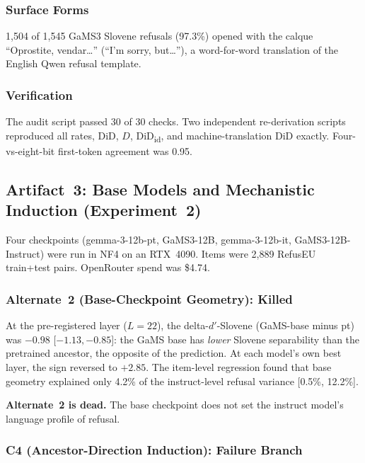 \documentclass[11pt,letterpaper]{article}
\begin{document}
\subsubsection{Surface Forms}

1,504 of 1,545 GaMS3 Slovene refusals (97.3\%) opened with the calque ``Oprostite, vendar\ldots'' (``I'm sorry, but\ldots''), a word-for-word translation of the English Qwen refusal template.

\subsubsection{Verification}

The audit script passed 30 of 30 checks. Two independent re-derivation scripts reproduced all rates, DiD, $D$, DiD\textsubscript{id}, and machine-translation DiD exactly. Four-vs-eight-bit first-token agreement was 0.95.


\subsection{Artifact~3: Base Models and Mechanistic Induction (Experiment~2)}
\label{gen_art_experiment_2}

Four checkpoints (gemma-3-12b-pt, GaMS3-12B, gemma-3-12b-it, GaMS3-12B-Instruct) were run in NF4 on an RTX~4090. Items were 2,889 RefusEU train+test pairs. OpenRouter spend was \$4.74.

\subsubsection{Alternate~2 (Base-Checkpoint Geometry): Killed}

At the pre-registered layer ($L = 22$), the delta-$d'$-Slovene (GaMS-base minus pt) was $-0.98$ [$-1.13, -0.85$]: the GaMS base has \emph{lower} Slovene separability than the pretrained ancestor, the opposite of the prediction. At each model's own best layer, the sign reversed to $+2.85$. The item-level regression found that base geometry explained only 4.2\% of the instruct-level refusal variance [0.5\%, 12.2\%].

\textbf{Alternate~2 is dead.} The base checkpoint does not set the instruct model's language profile of refusal.

\subsubsection{C4 (Ancestor-Direction Induction): Failure Branch}
\end{document}
